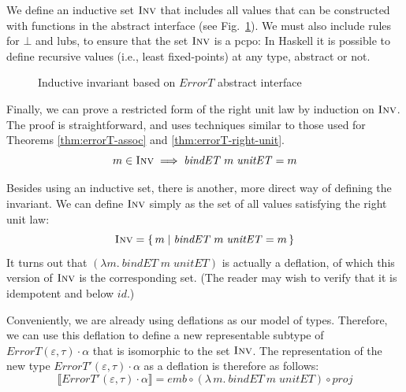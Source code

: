 \documentclass{sigplanconf}
\newcommand{\REP}[1]{\ensuremath{\llbracket#1\rrbracket}}
\newcommand{\hsc}[1]{\ensuremath{\mathit{#1}}}
\newcommand{\hsid}{\hsc{id}}
\newcommand{\hsemb}{\hsc{emb}}
\newcommand{\hsprj}{\hsc{proj}}
\newcommand{\INV}{\text{\textsc{Inv}}}
\newcommand{\tA}{\alpha}
\newcommand{\tE}{\varepsilon}
\newcommand{\tT}{\tau}
\theoremstyle{definition}
\begin{document}
We define an inductive set $\INV$ that includes all values that can be constructed with functions in the abstract interface (see Fig.~\ref{fig:invET}). We must also include rules for $\bot$ and lubs, to ensure that the set $\INV$ is a pcpo: In Haskell it is possible to define recursive values (i.e., least fixed-points) at any type, abstract or not.

\begin{figure}
\caption{Inductive invariant based on \hsc{ErrorT} abstract interface}
\label{fig:invET}
\end{figure}

Finally, we can prove a restricted form of the right unit law by induction on $\INV$. The proof is straightforward, and uses techniques similar to those used for Theorems \ref{thm:errorT-assoc} and \ref{thm:errorT-right-unit}.
%
\begin{equation}
m \in \INV \implies \hsc{bindET}\;m\;\hsc{unitET} = m
\end{equation}

Besides using an inductive set, there is another, more direct way of defining the invariant. We can define $\INV$ simply as the set of all values satisfying the right unit law:
%
\begin{equation}
  \INV = \{\,m \mid \hsc{bindET}\;m\;\hsc{unitET} = m\,\}
\end{equation}
%
It turns out that $(\lambda{m}.\:\hsc{bindET}\;m\;\hsc{unitET})$ is actually a deflation, of which this version of $\INV$ is the corresponding set. (The reader may wish to verify that it is idempotent and below $\hsid$.)

Conveniently, we are already using deflations as our model of types. Therefore, we can use this deflation to define a new representable subtype of $\hsc{ErrorT}(\tE,\tT)\cdot\tA$ that is isomorphic to the set $\INV$. The representation of the new type $\hsc{ErrorT'}(\tE,\tT)\cdot\alpha$ as a deflation is therefore as follows:
%
\begin{equation}
\REP{\hsc{ErrorT'}(\tE,\tT)\cdot\tA}
= \hsemb \circ (\lambda\,m.\:\hsc{bindET}\:m\;\hsc{unitET}) \circ \hsprj
\end{equation}
\end{document}
